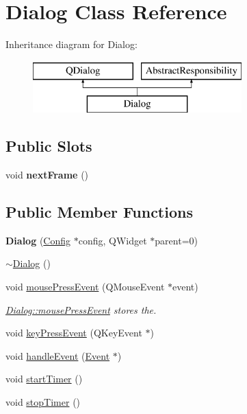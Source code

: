 \hypertarget{classDialog}{\section{Dialog Class Reference}
\label{classDialog}
}
Inheritance diagram for Dialog\-:\begin{figure}[H]
\begin{center}
\leavevmode
\includegraphics[height=2.000000cm]{classDialog}
\end{center}
\end{figure}
\subsection*{Public Slots}
\begin{DoxyCompactItemize}
\item 
\hypertarget{classDialog_a8bc4fe3b0cc12033369b49eab8751e14}{void {\bfseries next\-Frame} ()}\label{classDialog_a8bc4fe3b0cc12033369b49eab8751e14}

\end{DoxyCompactItemize}
\subsection*{Public Member Functions}
\begin{DoxyCompactItemize}
\item 
\hypertarget{classDialog_a92143e1be7913dd7cdb93a3abfc53ebc}{{\bfseries Dialog} (\hyperlink{classConfig}{Config} $\ast$config, Q\-Widget $\ast$parent=0)}\label{classDialog_a92143e1be7913dd7cdb93a3abfc53ebc}

\item 
\hyperlink{classDialog_a2a1fe6ef28513eed13bfcd3a4da83ccb}{$\sim$\-Dialog} ()
\item 
void \hyperlink{classDialog_a95aaa4d78bda5c07650d383d3c5292ac}{mouse\-Press\-Event} (Q\-Mouse\-Event $\ast$event)
\begin{DoxyCompactList}\small\item\em \hyperlink{classDialog_a95aaa4d78bda5c07650d383d3c5292ac}{Dialog\-::mouse\-Press\-Event} stores the. \end{DoxyCompactList}\item 
void \hyperlink{classDialog_a97894cd3d240b62d9da4f915b9e16a12}{key\-Press\-Event} (Q\-Key\-Event $\ast$)
\item 
void \hyperlink{classDialog_a64bf1a64d37efa953896fbc106f55a56}{handle\-Event} (\hyperlink{classEvent}{Event} $\ast$)
\item 
void \hyperlink{classDialog_ae1dd568c8ea45c8aa7782a5de28846ea}{start\-Timer} ()
\item 
void \hyperlink{classDialog_accd61d9aca9f76417c2129c04d0e7dcf}{stop\-Timer} ()
\end{DoxyCompactItemize}
